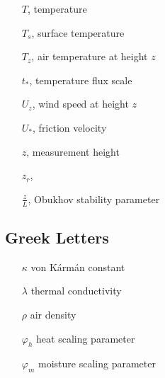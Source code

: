 \begin{enumerate}
    \item[]$T$, temperature
    \item[]$T_{s}$, surface temperature
    \item[]$T_{z}$, air temperature at height $z$
    \item[]$t_{*}$, temperature flux scale
    \item[]$U_{z}$, wind speed at height $z$
    \item[]$U_{*}$, friction velocity
    \item[]$z$, measurement height
    \item[]$z_{r}$,
    \item[]$\frac{z}{L}$, Obukhov stability parameter
\end{enumerate}
\subsection{Greek Letters}
\begin{enumerate}
    \item[$\kappa$] von K\'{a}rm\'{a}n constant
    \item[$\lambda$] thermal conductivity
    \item[$\rho$] air density
    \item[$\varphi_{h}$] heat scaling parameter
    \item[$\varphi_{m}$] moisture scaling parameter
\end{enumerate}

